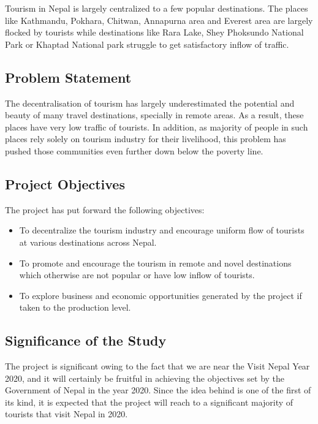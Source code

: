 \documentclass[12pt, a4paper, oneside]{article}
\begin{document}
Tourism in Nepal is largely centralized to a few popular destinations. The places like Kathmandu, Pokhara, Chitwan, Annapurna area and Everest area are largely flocked by tourists while destinations like Rara Lake, Shey Phoksundo National Park or Khaptad National park struggle to get satisfactory inflow of traffic.

\subsection{Problem Statement}
The decentralisation of tourism has largely underestimated the potential and beauty of many travel destinations, specially in remote areas. As a result, these places have very low traffic of tourists. In addition, as majority of people in such places rely solely on tourism industry for their livelihood, this problem has pushed those communities even further down below the poverty line.

\subsection{Project Objectives}
The project has put forward the following objectives:

\begin{itemize}
	\item To decentralize the tourism industry and encourage uniform flow of tourists at various destinations across Nepal.
	\item To promote and encourage the tourism in remote and novel destinations which otherwise are not popular or have low inflow of tourists.
	\item To explore business and economic opportunities generated by the project if taken to the production level.
\end{itemize}

\subsection{Significance of the Study}
The project is significant owing to the fact that we are near the Visit Nepal Year 2020, and it will certainly be fruitful in achieving the objectives set by the Government of Nepal in the year 2020. Since the idea behind is one of the first of its kind, it is expected that the project will reach to a significant majority of tourists that visit Nepal in 2020.
\end{document}
